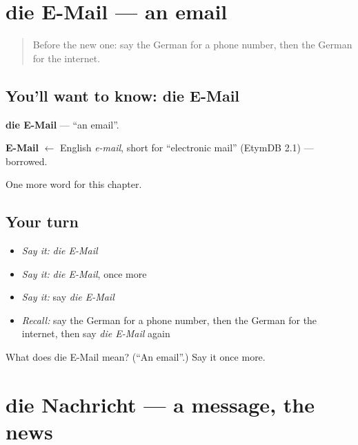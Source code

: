 \section[die E-Mail]{die E-Mail — an email}

\label{lesson:GE-C159-e-mail}



\begin{quote}
Before the new one: say the German for a phone number, then the German for the internet.
\end{quote}

\subsection*{You'll want to know: die E-Mail}
\textbf{die E-Mail} — \textquotedblleft{}an email\textquotedblright{}.

\begin{cousinweb}
\textbf{E-Mail} $\leftarrow$ English \emph{e-mail}, short for \textquotedblleft{}electronic mail\textquotedblright{} (EtymDB 2.1) — borrowed.
\end{cousinweb}

\begin{grammarlens}[title={What you've built}]
One more word for this chapter.
\end{grammarlens}

\subsection*{Your turn}
\begin{itemize}
\raggedright
  \item \emph{Say it:} \emph{die E-Mail}
  \item \emph{Say it:} \emph{die E-Mail}, once more
  \item \emph{Say it:} say \emph{die E-Mail}
  \item \emph{Recall:} say the German for a phone number, then the German for the internet, then say \emph{die E-Mail} again
\end{itemize}

\begin{tcolorbox}[breakable,colback=teal!4,colframe=teal!35!black,title={Before you move on}]
What does die E-Mail mean? (\textquotedblleft{}An email\textquotedblright{}.) Say it once more.
\end{tcolorbox}
\section[die Nachricht]{die Nachricht — a message, the news}

